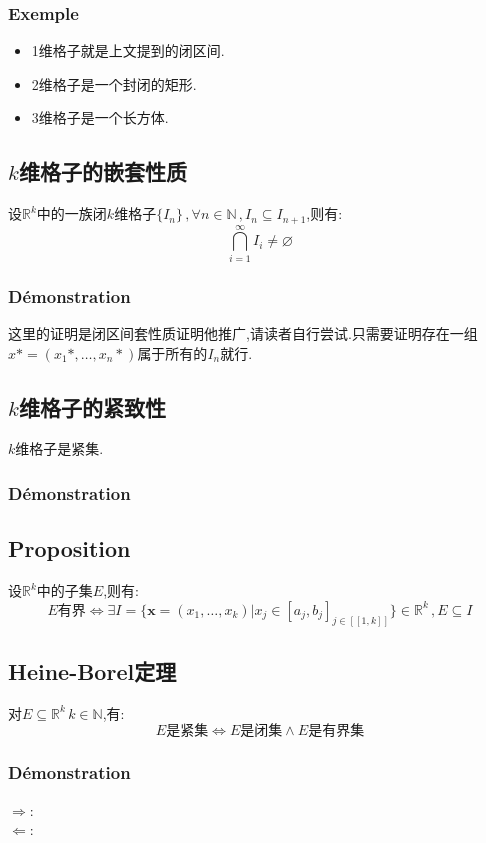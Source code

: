 \documentclass[12pt, a4paper, oneside]{ctexbook}
\begin{document}
  \subsubsection{Exemple}
  \begin{itemize}
    \item 1维格子就是上文提到的闭区间.
    \item 2维格子是一个封闭的矩形.
    \item 3维格子是一个长方体.
  \end{itemize}
  \subsection{$k$维格子的嵌套性质}
  设$\mathbb{R}^k$中的一族闭$k$维格子$\{I_n \}\,, \forall n\in \mathbb{N}\,,I_n\subseteq I_{n+1}$,则有:
  $$
    \bigcap_{i=1}^\infty I_i\neq \varnothing
  $$
  \subsubsection{Démonstration}
  这里的证明是闭区间套性质证明他推广,请读者自行尝试.只需要证明存在一组$x*=(x_1*,\dots,x_n*)$属于所有的$I_n$就行.

  \subsection{$k$维格子的紧致性}
  $k$维格子是紧集.
  \subsubsection{Démonstration}

  \subsection{Proposition}
  设$\mathbb{R}^k$中的子集$E$,则有:
  $$
  E\text{有界}\Leftrightarrow\exists I=\{\textbf{x}=(x_1,\dots,x_k)|x_j\in[a_j,b_j]_{j\in[\![1,k]\!]} \}\in \mathbb{R}^k\,, E\subseteq I
  $$
  \subsection{Heine-Borel定理}
  对$E\subseteq \mathbb{R}^k\, k\in \mathbb{N}$,有:
  $$
  E\text{是紧集}\Leftrightarrow E\text{是闭集}\land E\text{是有界集}
  $$
  \subsubsection{Démonstration}
  \noindent
  $\Rightarrow$:\\
  $\Leftarrow$:\\
\end{document}
